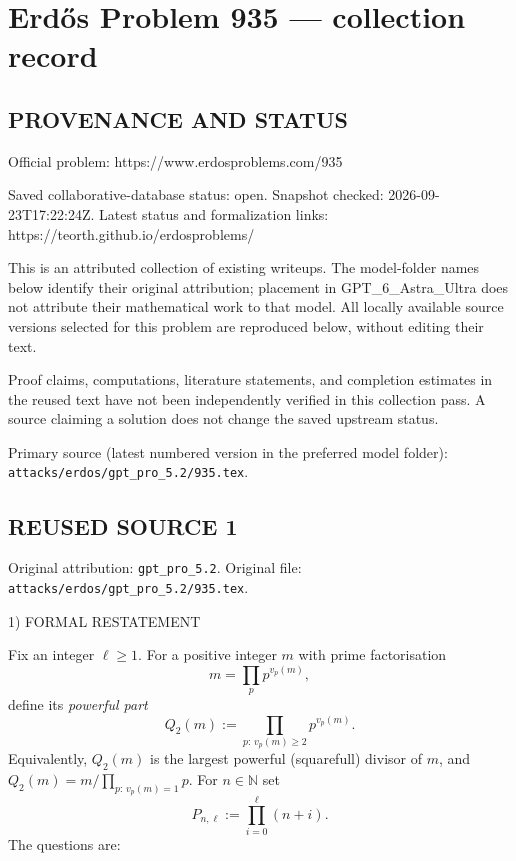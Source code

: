\section*{Erd\H{o}s Problem 935 --- collection record}

\subsection*{PROVENANCE AND STATUS}
Official problem: https://www.erdosproblems.com/935

Saved collaborative-database status: open.
Snapshot checked: 2026-09-23T17:22:24Z.
Latest status and formalization links: https://teorth.github.io/erdosproblems/

This is an attributed collection of existing writeups. The model-folder names below identify their original attribution; placement in GPT\_6\_Astra\_Ultra does not attribute their mathematical work to that model. All locally available source versions selected for this problem are reproduced below, without editing their text.

Proof claims, computations, literature statements, and completion estimates in the reused text have not been independently verified in this collection pass. A source claiming a solution does not change the saved upstream status.

Primary source (latest numbered version in the preferred model folder): \texttt{attacks/erdos/gpt\_pro\_5.2/935.tex}.

\subsection*{REUSED SOURCE 1}
Original attribution: \texttt{gpt\_pro\_5.2}.
Original file: \texttt{attacks/erdos/gpt\_pro\_5.2/935.tex}.


1) FORMAL RESTATEMENT

Fix an integer \(\ell\ge 1\). For a positive integer \(m\) with prime factorisation
\[m=\prod_{p} p^{v_p(m)},\]
define its \emph{powerful part}
\[Q_2(m):=\prod_{p:\,v_p(m)\ge 2} p^{v_p(m)}.\]
Equivalently, \(Q_2(m)\) is the largest powerful (squarefull) divisor of \(m\), and
\(Q_2(m)=m/\prod_{p:\,v_p(m)=1}p\).
For \(n\in\mathbb N\) set
\[P_{n,\ell}:=\prod_{i=0}^{\ell} (n+i).\]
The questions are:

